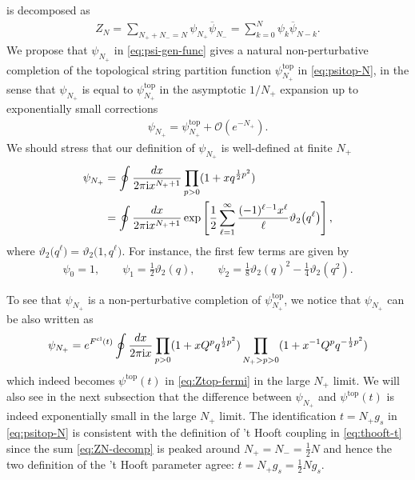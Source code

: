 \documentclass[11pt]{article}
\newcommand{\ri}{{\rm i}}
\newcommand{\hf}{\frac{1}{2}}
\newcommand{\qu}{\frac{1}{4}}
\def\b#1{\overline{#1}}
\renewcommand{\[}{\begin{eqnarray}}
\renewcommand{\]}{\end{eqnarray}}
\begin{document}
is decomposed as
\begin{align}
 Z_N=\sum_{N_++N_-=N}\psi_{N_+}\b{\psi}_{N_-}=\sum_{k=0}^N \psi_{k}\b{\psi}_{N-k}.
\label{eq:ZN-decomp}
\end{align}
We propose that $\psi_{N_+}$ in \eqref{eq:psi-gen-func}
gives a natural non-perturbative completion
of the topological string partition function 
$\psi^{\text{top}}_{N_+}$ in \eqref{eq:psitop-N},
in the sense that
$\psi_{N_+}$ is equal to 
 $\psi^{\text{top}}_{N_+}$ in the asymptotic $1/N_{+}$ 
expansion up to exponentially small corrections
\begin{align}
 \psi_{N_+}=\psi^{\text{top}}_{N_+}+\mathcal{O}(e^{-N_+}).
\label{eq:psiapprox}
\end{align}
We should stress that our definition of $\psi_{N_+}$ is well-defined at finite $N_+$
\begin{align}
\begin{aligned}
 \psi_{N_+}&=\oint\frac{dx}{2\pi\ri x^{N_++1}}\prod_{p>0}(1+xq^{\hf p^2})\\
&=\oint\frac{dx}{2\pi\ri x^{N_++1}}
\exp\left[\hf\sum_{\ell=1}^\infty\frac{(-1)^{\ell-1}x^\ell}{\ell}
\vartheta_2\bigl(q^\ell\bigr)
\right], 
\end{aligned}
\label{eq:psi-int}
\end{align}
where $\vartheta_2\bigl(q^\ell\bigr)=\vartheta_2\bigl(1,q^\ell\bigr)$.
For instance, the first few terms are given by
\begin{align}
 \psi_0=1,\qquad
\psi_1=\hf\vartheta_2(q),\qquad
\psi_2=\frac{1}{8} \vartheta_2(q)^2-\qu \vartheta_2(q^2). 
\end{align}


To see that $\psi_{N_+}$ is a non-perturbative completion of $\psi^{\text{top}}_{N_+}$, 
we notice that $\psi_{N_+}$ can be also written as
\begin{align}
 \psi_{N_+}=e^{F^{\text{cl}}(t)}\oint \frac{dx}{2\pi\ri x}\prod_{p>0}(1+xQ^pq^{\hf p^2})
\prod_{N_+>p>0}(1+x^{-1}Q^p q^{-\hf p^2})
\end{align}
which indeed becomes $\psi^{\text{top}}(t)$ in \eqref{eq:Ztop-fermi}
in the large $N_+$ limit. We will also see in the next subsection that the difference
between $\psi_{N_+}$ and $\psi^{\text{top}}(t)$ is indeed exponentially small
in the large $N_+$ limit.
The identification $t=N_+g_s$ in \eqref{eq:psitop-N}
is consistent with the definition of 't Hooft coupling in
\eqref{eq:thooft-t} since the sum \eqref{eq:ZN-decomp} is peaked around
$N_+=N_-=\hf N$ and hence the two definition of the 't Hooft parameter agree:
$t=N_+g_s=\hf Ng_s$.
\end{document}
